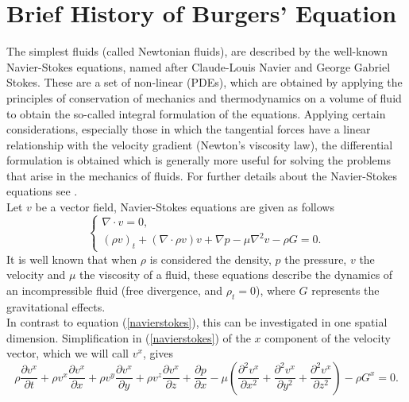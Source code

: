 \section{Brief History of Burgers' Equation}
    
    The simplest fluids (called Newtonian fluids), are described by the well-known Navier-Stokes equations, named after Claude-Louis Navier and George Gabriel Stokes. These are a set of non-linear (PDEs), which are obtained by applying the principles of conservation of mechanics and thermodynamics on a volume of fluid to obtain the so-called integral formulation of the equations. Applying certain considerations, especially those in which the tangential forces have a linear relationship with the velocity gradient (Newton's viscosity law), the differential formulation is obtained which is generally more useful for solving the problems that arise in the mechanics of fluids. For further details about the Navier-Stokes equations see \cite{Acheson2001, Batchelor1967, Landau1987, Currie1974, Temam1984}. \\
    
    Let $v$ be a vector field, Navier-Stokes equations are given as follows
    \begin{equation}
        \left \lbrace \begin{array}{ll}
    	\nabla \cdot v = 0, \\
    	(\rho v)_t + (\nabla \cdot \rho v) v + \nabla p - \mu \nabla^2 v - \rho G = 0.
    	\end{array}  \right .
    	\label{navierstokes}
    \end{equation}
    It is well known that when $\rho$ is considered the density, $p$ the pressure, $v$ the velocity and $\mu$ the viscosity of a fluid, these equations describe the dynamics of an incompressible fluid (free divergence, and $\rho_t = 0$), where $G$ represents the gravitational effects. \\
    
    In contrast to equation (\ref{navierstokes}), this can be investigated in one spatial dimension. Simplification in (\ref{navierstokes}) of the $x$ component of the velocity vector, which we will call $v^x$, gives
    \begin{equation*}
        \rho \frac{\partial v^x}{\partial t} + \rho v^x \frac{\partial v^x}{\partial x} + \rho v^y \frac{\partial v^x}{\partial y} + \rho v^z \frac{\partial v^x}{\partial z} + \frac{\partial p}{\partial x} - \mu \left(\frac{\partial^2 v^x}{\partial x^2} + \frac{\partial^2 v^x}{\partial y^2} + \frac{\partial^2 v^x}{\partial z^2} \right) - \rho G^x = 0.
    \end{equation*}

